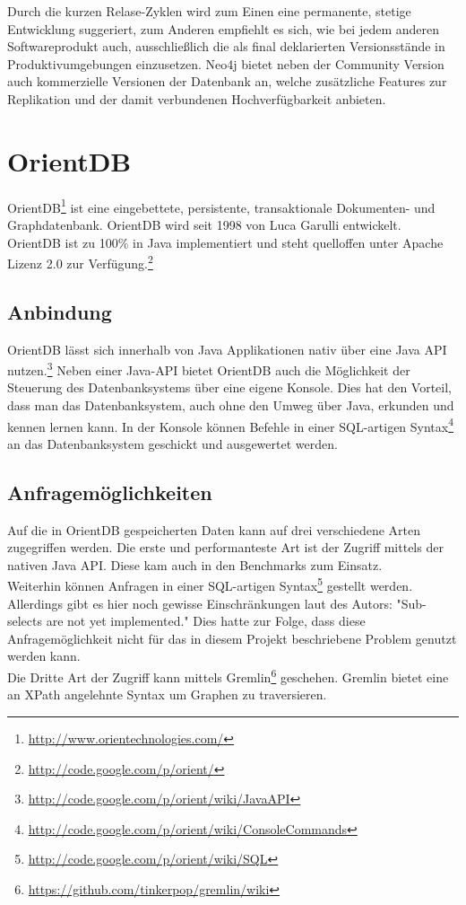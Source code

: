 \documentclass[11pt, a4paper, oneside]{article} %
\begin{document}
Durch die kurzen Relase-Zyklen wird zum Einen eine permanente, stetige Entwicklung suggeriert, zum Anderen empfiehlt es sich, wie bei jedem anderen Softwareprodukt auch, ausschließlich die als final deklarierten Versionsstände in Produktivumgebungen einzusetzen. Neo4j bietet neben der Community Version auch kommerzielle Versionen der Datenbank an, welche zusätzliche Features zur Replikation und der damit verbundenen Hochverfügbarkeit anbieten.

\section{OrientDB}

OrientDB\footnote{\url{http://www.orientechnologies.com/}} ist eine eingebettete, persistente, transaktionale Dokumenten- und Graphdatenbank. OrientDB wird seit 1998 von Luca Garulli entwickelt. OrientDB ist zu 100\% in Java implementiert und steht quelloffen unter Apache Lizenz 2.0 zur Verfügung.\footnote{\url{http://code.google.com/p/orient/}}



\subsection{Anbindung}

OrientDB lässt sich innerhalb von Java Applikationen nativ über eine Java API nutzen.\footnote{\url{http://code.google.com/p/orient/wiki/JavaAPI}} Neben einer Java-API bietet OrientDB auch die Möglichkeit der Steuerung des Datenbanksystems über eine eigene Konsole. Dies hat den Vorteil, dass man das Datenbanksystem, auch ohne den Umweg über Java, erkunden und kennen lernen kann. In der Konsole können Befehle in einer SQL-artigen Syntax\footnote{\url{http://code.google.com/p/orient/wiki/ConsoleCommands}} an das Datenbanksystem geschickt und ausgewertet werden.



\subsection{Anfragemöglichkeiten}
Auf die in OrientDB gespeicherten Daten kann auf drei verschiedene Arten zugegriffen werden. Die erste und performanteste Art ist der Zugriff mittels der nativen Java API. Diese kam auch in den Benchmarks zum Einsatz. \\
Weiterhin können Anfragen in einer SQL-artigen Syntax\footnote{\url{http://code.google.com/p/orient/wiki/SQL}} gestellt werden. Allerdings gibt es hier noch gewisse Einschränkungen laut des Autors: "Sub-selects are not yet implemented." Dies hatte zur Folge, dass diese Anfragemöglichkeit nicht für das in diesem Projekt beschriebene Problem genutzt werden kann. \\
Die Dritte Art der Zugriff kann mittels Gremlin\footnote{\url{https://github.com/tinkerpop/gremlin/wiki}} geschehen. Gremlin bietet eine an XPath angelehnte Syntax um Graphen zu traversieren.
\end{document}
